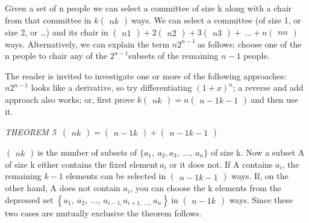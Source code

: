 \documentclass[10pt,letter]{article}
\begin{document}
Given a set of n people we can select a committee of size k along with a
chair from that committee in \(k
\begin{pmatrix}
n
k
\end{pmatrix}
\ \)ways. We can select a committee (of size 1, or size 2,
or \ldots{}) and its chair in \(\begin{pmatrix}
n
1
\end{pmatrix}
 + 2
\begin{pmatrix}
n
2
\end{pmatrix}
 + 3
\begin{pmatrix}
n
3
\end{pmatrix}
 + \ \ldots + n
\begin{pmatrix}
n
n
\end{pmatrix}
\ \)ways. Alternatively, we can explain the term
\(n2^{n - 1}\ \)as follows: choose one of the n people to chair any of
the \(2^{n - 1}\)subsets of the remaining \(n - 1\) people.

The reader is invited to investigate one or more of the following
approaches: \(n2^{n - 1}\) looks like a derivative, so try
differentiating \(\left( 1 + x \right)^{n}\); a reverse and add approach
also works; or, first prove \(k
\begin{pmatrix}
n
k
\end{pmatrix}
 = n
\begin{pmatrix}
n - 1
k - 1
\end{pmatrix}
\ \)and then use it.

\emph{THEOREM 5} \(\
\begin{pmatrix}
n
k
\end{pmatrix}
 =
\begin{pmatrix}
n - 1
k
\end{pmatrix}
 +
\begin{pmatrix}
n - 1
k - 1
\end{pmatrix}
\)

\(\begin{pmatrix}
n
k
\end{pmatrix}
\ \)is the number of subsets of
\(\{ a_{1},\ a_{2},a_{3},\ \ldots,\ a_{n}\}\) of size k. Now a subset A
of size k either contains the fixed element\(\ a_{i}\) or it does not.
If A contains \(a_{i}\), the remaining \(k - 1\) elements can be
selected in \(\begin{pmatrix}
n - 1
k - 1
\end{pmatrix}
\) ways. If, on the other hand, A does not contain
\(a_{i}\), you can choose the k elements from the depressed set
\(\left\{ a_{1},\ a_{2},\ \ldots,\ a_{i - 1,}a_{i + 1,\ \ldots,\ }a_{n} \right\}\ \)in
\(\begin{pmatrix}
n - 1
k
\end{pmatrix}
\) ways. Since these two cases are mutually exclusive the
theorem follows.
\end{document}
